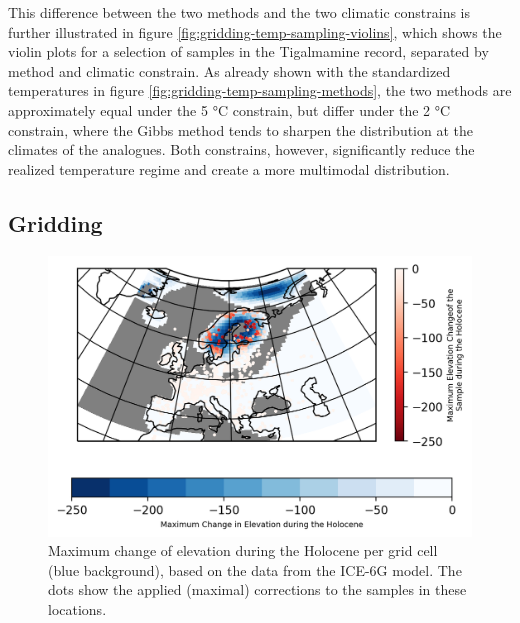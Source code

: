 \begin{refsection}
This difference between the two methods and the two climatic constrains is further illustrated in figure \ref{fig:gridding-temp-sampling-violins}, which shows the violin plots for a selection of samples in the Tigalmamine record, separated by method and climatic constrain. As already shown with the standardized temperatures in figure \ref{fig:gridding-temp-sampling-methods}, the two methods are approximately equal under the 5 °C constrain, but differ under the 2 °C constrain, where the Gibbs method tends to sharpen the distribution at the climates of the analogues. Both constrains, however, significantly reduce the realized temperature regime and create a more multimodal distribution.

\subsection{Gridding}  \label{sec:gridding-gridding}

\begin{figure}
	\includegraphics[width=\linewidth]{gridding-figures/elevation-difference.png}
	\caption[Elevation difference and corrections]{Maximum change of elevation during the Holocene per grid cell (blue background), based on the data from the ICE-6G model. The dots show the applied (maximal) corrections to the samples in these locations. }
	\label{fig:gridding-elev-correction}
\end{figure}


\end{refsection}
